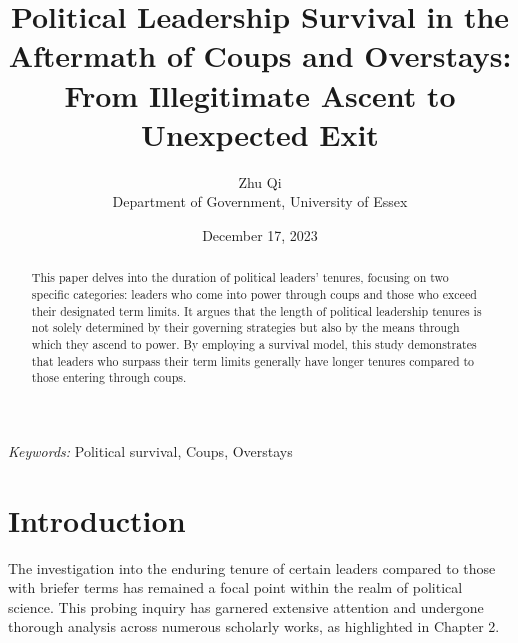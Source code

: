\documentclass[
  12pt,
  a4paper,
  12pt]{article}
\begin{document}
\def\spacingset#1{\renewcommand{\baselinestretch}%
{#1}\small\normalsize} \spacingset{1}



\date{December 17, 2023}
\title{\bf Political Leadership Survival in the Aftermath of Coups and
Overstays: From Illegitimate Ascent to Unexpected Exit}
\author{
Zhu Qi\\
Department of Government, University of Essex\\
}
\maketitle

\bigskip
\bigskip
\begin{abstract}
This paper delves into the duration of political leaders' tenures,
focusing on two specific categories: leaders who come into power through
coups and those who exceed their designated term limits. It argues that
the length of political leadership tenures is not solely determined by
their governing strategies but also by the means through which they
ascend to power. By employing a survival model, this study demonstrates
that leaders who surpass their term limits generally have longer tenures
compared to those entering through coups.
\end{abstract}

\noindent%
{\it Keywords:} Political survival, Coups, Overstays
\vfill

\newpage
\spacingset{1.9} %
\ifdefined\Shaded\renewenvironment{Shaded}{\begin{tcolorbox}[sharp corners, interior hidden, breakable, frame hidden, boxrule=0pt, borderline west={3pt}{0pt}{shadecolor}, enhanced]}{\end{tcolorbox}}\fi

\hypertarget{introduction}{%
\section{Introduction}\label{introduction}}

The investigation into the enduring tenure of certain leaders compared
to those with briefer terms has remained a focal point within the realm
of political science. This probing inquiry has garnered extensive
attention and undergone thorough analysis across numerous scholarly
works, as highlighted in Chapter 2.
\end{document}
